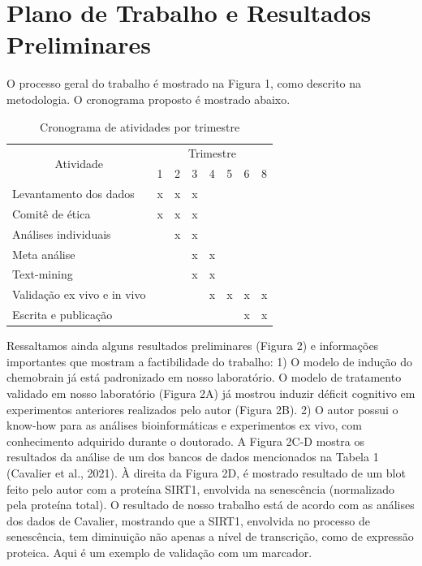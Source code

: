 \documentclass[12pt,a4paper]{article}
\begin{document}
	
\section{Plano de Trabalho e Resultados Preliminares} \indent
	
O processo geral do trabalho é mostrado na Figura 1, como descrito na metodologia. O cronograma proposto é mostrado abaixo. \\
	
\begin{table}[htbp]
	\centering
	\caption{Cronograma de atividades por trimestre} %
	\begin{tabular}{llllllll}
		\hline
		\multicolumn{1}{c}{\multirow{2}{*}{Atividade}} & \multicolumn{7}{c}{Trimestre} \\
		\multicolumn{1}{c}{}                           & 1  & 2  & 3  & 4  & 5 & 6 & 8 \\
		\hline
		Levantamento dos dados                         & x  & x  & x  &    &   &   &   \\
		Comitê de ética                                & x  & x  & x  &    &   &   &   \\
		Análises individuais                           &    & x  & x  &    &   &   &   \\
		Meta análise                                   &    &    & x  & x  &   &   &   \\
		Text-mining                                    &    &    & x  & x  &   &   &   \\
		Validação ex vivo e in vivo                     &    &    &    & x  & x & x & x \\
		Escrita e publicação                           &    &    &    &    &   & x & x \\
		\hline
	\end{tabular}
\end{table} \indent

Ressaltamos ainda alguns resultados preliminares (Figura 2) e informações importantes que mostram a factibilidade do trabalho: 1) O modelo de indução do chemobrain já está padronizado em nosso laboratório. O modelo de tratamento validado em nosso laboratório (Figura 2A) já mostrou induzir déficit cognitivo em experimentos anteriores realizados pelo autor (Figura 2B). 2) O autor possui o know-how para as análises bioinformáticas e experimentos ex vivo, com conhecimento adquirido durante o doutorado. A Figura 2C-D mostra os resultados da análise de um dos bancos de dados mencionados na Tabela 1 (Cavalier et al., 2021). À direita da Figura 2D, é mostrado resultado de um blot feito pelo autor com a proteína SIRT1, envolvida na senescência (normalizado pela proteína total). O resultado de nosso trabalho está de acordo com as análises dos dados de Cavalier, mostrando que a SIRT1, envolvida no processo de senescência, tem diminuição não apenas a nível de transcrição, como de expressão proteica. Aqui é um exemplo de validação com um marcador.
\end{document}
